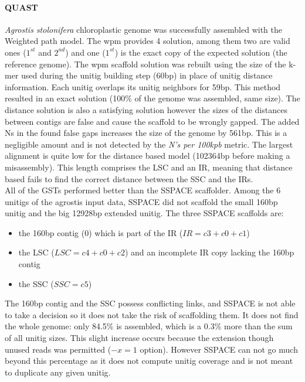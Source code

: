 \documentclass[12pt]{article}
\begin{document}
\paragraph*{QUAST} 
\textit{Agrostis stolonifera}  chloroplastic genome was successfully assembled with the Weighted path model. The wpm provides 4 solution, among them two are valid ones ($1^{st}$ and $2^{nd}$) and one ($1^{st}$) is the exact copy of the expected solution (the reference genome). The wpm scaffold solution was rebuilt using the size of the k-mer used during the unitig building step (60bp) in place of unitig distance information. Each unitig overlaps its unitig neighbors for 59bp. This method resulted in an exact solution (100\% of the genome was assembled, same size). The distance solution is also a satisfying solution however the sizes of the distances between contigs are false and cause the scaffold to be wrongly gapped. The added Ns in the found false gaps increases the size of the genome by 561bp. This is a negligible amount and is not detected by the \textit{N's per 100kpb} metric. The largest alignment is quite low for the distance based model (102364bp before making a misassembly). This length comprises the LSC and an IR, meaning that distance based fails to find the correct distance between the SSC and the IRs. \\ All of the GSTs performed better than the SSPACE scaffolder. Among the 6 unitigs of the agrostis input data, SSPACE did not scaffold the small 160bp unitig and the big 12928bp extended unitig. The three SSPACE scaffolds are:
\begin{itemize}
\item the 160bp contig (0) which is part of the IR ($IR=c3+c0+c1$)
\item the LSC ($LSC=c4+c0+c2$) and an incomplete IR copy lacking the 160bp contig
\item the SSC ($SSC=c5$)
\end{itemize}
The 160bp contig and the SSC possess conflicting links, and SSPACE is not able to take a decision so it does not take the risk of scaffolding them. It does not find the whole genome: only 84.5\% is assembled, which is a 0.3\% more than the sum of all unitig sizes. This slight increase occurs because the extension though unused reads was permitted ($-x=1$ option). However SSPACE can not go much beyond this percentage as it does not compute unitig coverage and is not meant to duplicate any given unitig. 
\end{document}

